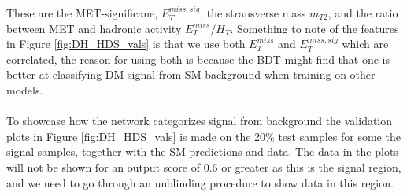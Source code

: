 \documentclass[12pt, a4paper]{book}
\begin{document}
These are the MET-significane, $E_T^{miss,sig}$, the stransverse mass $m_{T2}$, and the ratio between MET and hadronic activity $E_T^{miss}/H_T$. Something to note of the features in Figure \ref{fig:DH_HDS_vals} is that we use both $E_T^{miss}$ and $E_T^{miss,sig}$ which are correlated, the reason for using both is because the BDT 
might find that one is better at classifying DM signal from SM background when training on other models.\\
\\To showcase how the network categorizes signal from background the validation plots in Figure \ref{fig:DH_HDS_vals} is made on the 20\% test samples for some the signal samples, together with the SM predictions and data. The data in the plots will not be shown for an output score of 0.6 or greater as this is the signal region, and 
we need to go through an unblinding procedure to show data in this region.\\
\end{document}
